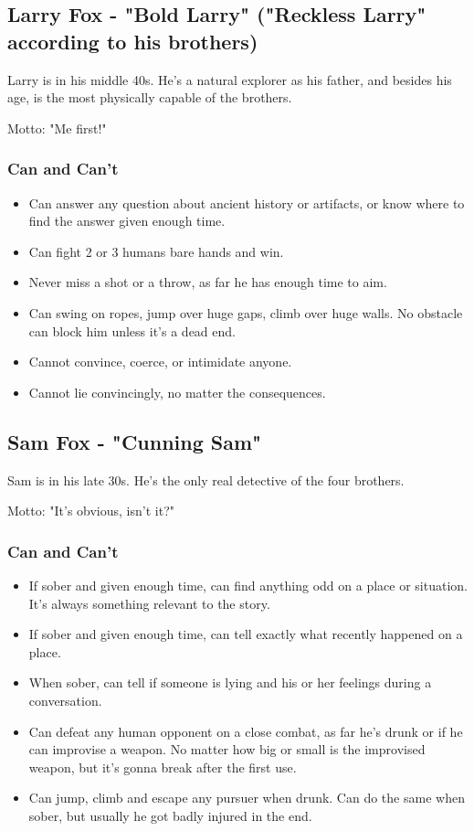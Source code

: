 \documentclass[11pt]{article}
\begin{document}
\subsection{Larry Fox - "Bold Larry" ("Reckless Larry" according to his brothers)}
\label{sec:orgcf82d2d}
Larry is in his middle 40s. He's a natural explorer as his father, and besides his age, is the most physically capable of the brothers.

Motto: "Me first!"

\subsubsection{Can and Can't}
\label{sec:org9c9803a}
\begin{itemize}
\item Can answer any question about ancient history or artifacts, or know where to find the answer given enough time.
\item Can fight 2 or 3 humans bare hands and win.
\item Never miss a shot or a throw, as far he has enough time to aim.
\item Can swing on ropes, jump over huge gaps, climb over huge walls. No obstacle can block him unless it's a dead end.
\item Cannot convince, coerce, or intimidate anyone.
\item Cannot lie convincingly, no matter the consequences.
\end{itemize}

\subsection{Sam Fox - "Cunning Sam"}
\label{sec:orgc38bb3d}
Sam is in his late 30s. He's the only real detective of the four brothers.

Motto: "It's obvious, isn't it?"

\subsubsection{Can and Can't}
\label{sec:orge2ce8a5}
\begin{itemize}
\item If sober and given enough time, can find anything odd on a place or situation. It's always something relevant to the story.
\item If sober and given enough time, can tell exactly what recently happened on a place.
\item When sober, can tell if someone is lying and his or her feelings during a conversation.
\item Can defeat any human opponent on a close combat, as far he's drunk or if he can improvise a weapon. No matter how big or small is the improvised weapon, but it's gonna break after the first use.
\item Can jump, climb and escape any pursuer when drunk. Can do the same when sober, but usually he got badly injured in the end.
\end{itemize}
\end{document}
